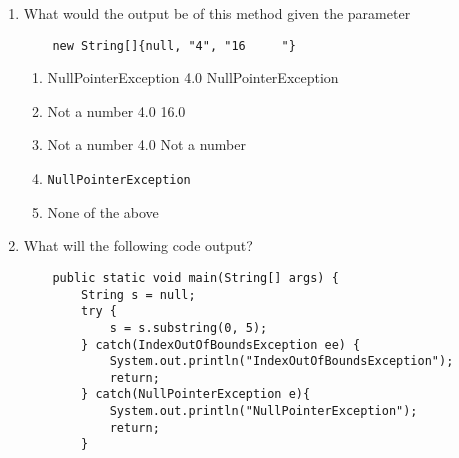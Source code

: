 \documentclass[S17-Final.tex]{subfiles}
\begin{document}
\begin{enumerate}
\begin{lstlisting}
    public static void printSquare(String[] nums) throws NullPointerException {
        for(String str : nums) {
            str.replaceAll("\\s+",""); // removes white space
            try {
                System.out.print(Math.pow(Integer.parseInt(str),2) + "\t");
            } catch(NumberFormatException e) {
                System.out.print("Not a number\t");
            }
        }
    }

\end{lstlisting}


	

\item 	What would the output be of this method given the parameter
\begin{lstlisting}
	new String[]{null, "4", "16     "}
\end{lstlisting}
	
\begin{enumerate}
\item  NullPointerException	4.0	NullPointerException
\item  Not a number	4.0	16.0
\item  Not a number	4.0	Not a number \ifdraft \Ans \fi 
\item  \texttt{NullPointerException}
\item  None of the above
\end{enumerate}

\item What will the following code output?
\begin{lstlisting}
    public static void main(String[] args) {
        String s = null;
        try {
            s = s.substring(0, 5);
        } catch(IndexOutOfBoundsException ee) {
            System.out.println("IndexOutOfBoundsException");
            return;
        } catch(NullPointerException e){
            System.out.println("NullPointerException");
            return;
        }
        

\end{lstlisting}
\end{enumerate}
\end{document}
